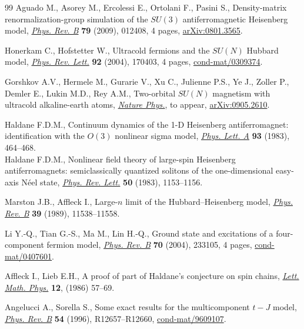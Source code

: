 \documentclass[pdftex]{sigma}
\begin{document}
\begin{thebibliography}{99}
Aguado M., Asorey M., Ercolessi E., Ortolani F., Pasini S.,
Density-matrix renormalization-group simulation of the $SU(3)$ antiferromagnetic Heisenberg model,
\href{http://dx.doi.org/10.1103/PhysRevB.79.012408}{{\it Phys. Rev. B}} {\bf 79} (2009), 012408, 4 pages,
\href{http://arxiv.org/abs/0801.3565}{arXiv:0801.3565}.

Honerkam C., Hofstetter W.,
Ultracold fermions and the $SU(N)$ Hubbard model,
\href{http://dx.doi.org/10.1103/PhysRevLett.92.170403}{{\it Phys. Rev. Lett.}} {\bf 92} (2004), 170403, 4 pages,
\href{http://arxiv.org/abs/cond-mat/0309374}{cond-mat/0309374}.

Gorshkov A.V., Hermele M., Gurarie V., Xu C., Julienne P.S.,
Ye J., Zoller P., Demler E., Lukin  M.D., Rey A.M.,
Two-orbital $SU(N)$ magnetism with ultracold alkaline-earth atoms,
\href{http://dx.doi.org/10.1038/nphys1535}{{\it Nature Phys.}}, to appear,
\href{http://arxiv.org/abs/0905.2610}{arXiv:0905.2610}.

Haldane F.D.M.,
Continuum dynamics of the 1-D Heisenberg antiferromagnet: identif\/ication with the $O(3)$ nonlinear sigma model,
\href{http://dx.doi.org/10.1016/0375-9601(83)90631-X}{{\it Phys. Lett. A}} {\bf 93} (1983), 464--468.\\
Haldane F.D.M.,
Nonlinear f\/ield theory of large-spin Heisenberg antiferromagnets:
semiclassically quantized solitons of the one-dimensional easy-axis N\'eel state,
\href{http://dx.doi.org/10.1103/PhysRevLett.50.1153}{{\it Phys. Rev. Lett.}} {\bf 50} (1983), 1153--1156.

Marston J.B., Af\/f\/leck I.,
Large-$n$ limit of the Hubbard--Heisenberg model,
\href{http://dx.doi.org/10.1103/PhysRevB.39.11538}{{\it Phys. Rev. B}} {\bf 39} (1989), 11538--11558.



Li Y.-Q., Tian G.-S., Ma M., Lin H.-Q.,
Ground state and excitations of a four-component fermion model,
\href{http://dx.doi.org/10.1103/PhysRevB.70.233105}{{\it Phys. Rev. B}} {\bf 70} (2004), 233105, 4 pages,
\href{http://arxiv.org/abs/cond-mat/0407601}{cond-mat/0407601}.


Af\/f\/leck I., Lieb E.H.,
A proof of part of Haldane's conjecture on spin chains,
\href{http://dx.doi.org/10.1007/BF00400304}{{\it Lett. Math. Phys.}} {\bf 12}, (1986) 57--69.

Angelucci A., Sorella S.,
Some exact results for the multicomponent $t-J$ model,
\href{http://dx.doi.org/10.1103/PhysRevB.54.R12657}{{\it Phys. Rev. B}} {\bf 54}  (1996), R12657--R12660,
\href{http://arxiv.org/abs/cond-mat/9609107}{cond-mat/9609107}.



\end{thebibliography}
\end{document}
